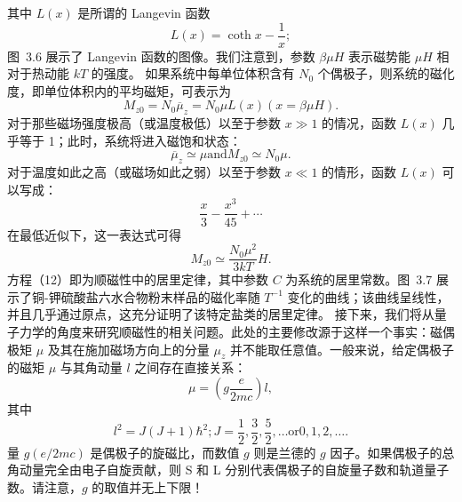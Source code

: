 其中 \(L(x)\) 是所谓的 Langevin 函数
\begin{equation}\tag{3.5.89}\label{eq:3.5.89}
L ( x ) = \coth x - { \frac { 1 } { x } } ;
\end{equation}
图~3.6 展示了 Langevin 函数的图像。我们注意到，参数 \(\beta\mu H\) 表示磁势能 \(\mu H\) 相对于热动能 \(kT\) 的强度。
如果系统中每单位体积含有 \(N_{0}\) 个偶极子，则系统的磁化度，即单位体积内的平均磁矩，可表示为
\begin{equation}\tag{3.5.90}\label{eq:3.5.90}
M _ { z 0 } = N _ { 0 } \overline { { \mu } } _ { z } = N _ { 0 } \mu L ( x )  ( x = \beta \mu H ) .
\end{equation}
对于那些磁场强度极高（或温度极低）以至于参数 \(x \gg 1\) 的情况，函数 \(L(x)\) 几乎等于 1；此时，系统将进入磁饱和状态：
\begin{equation}\tag{3.5.91}\label{eq:3.5.91}
\overline { { \mu } } _ { z } \simeq \mu  \mathrm { a n d }  M _ { z 0 } \simeq N _ { 0 } \mu .
\end{equation}
对于温度如此之高（或磁场如此之弱）以至于参数 \(x \ll 1\) 的情形，函数 \(L(x)\) 可以写成：
\begin{equation}\tag{3.5.92}\label{eq:3.5.92}
{ \frac { x } { 3 } } - { \frac { x ^{3} } { 45 } } + \cdots
\end{equation}
在最低近似下，这一表达式可得
\begin{equation}\tag{3.5.93}\label{eq:3.5.93}
M _ { z 0 } \simeq \frac { N _ { 0 } \mu ^{2} } { 3 k T } H .
\end{equation}
方程（12）即为顺磁性中的居里定律，其中参数 \(C\) 为系统的居里常数。图~3.7 展示了铜-钾硫酸盐六水合物粉末样品的磁化率随 \(T^{-1}\) 变化的曲线；该曲线呈线性，并且几乎通过原点，这充分证明了该特定盐类的居里定律。
接下来，我们将从量子力学的角度来研究顺磁性的相关问题。此处的主要修改源于这样一个事实：磁偶极矩 \(\mu\) 及其在施加磁场方向上的分量 \(\mu_{z}\) 并不能取任意值。一般来说，给定偶极子的磁矩 \(\mu\) 与其角动量 \(l\) 之间存在直接关系：
\begin{equation}\tag{3.5.94}\label{eq:3.5.94}
\mu = \left( g \frac { e } { 2 m c } \right) l ,
\end{equation}
其中
\begin{equation}\tag{3.5.95}\label{eq:3.5.95}
l ^{2} = J ( J + 1 ) \hbar ^{2} ;  J = \frac { 1 } { 2 } , \frac { 3 } { 2 } , \frac { 5 } { 2 } , \ldots  \mathrm { o r }  0 , 1 , 2 , \ldots .
\end{equation}
量 \(g(e/2mc)\) 是偶极子的旋磁比，而数值 \(g\) 则是兰德的 \(g\) 因子。如果偶极子的总角动量完全由电子自旋贡献，则
S 和 L 分别代表偶极子的自旋量子数和轨道量子数。请注意，\(g\) 的取值并无上下限！
